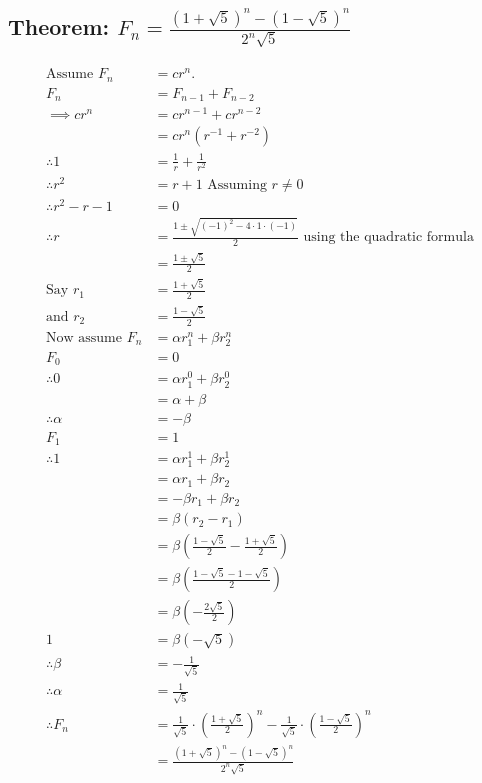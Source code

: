 \documentclass[11pt, oneside]{article}   	%
\begin{document}
	\subsection{Theorem: $F_n = \frac{(1 + \sqrt 5)^n - (1 - \sqrt 5)^n}{2^n\sqrt 5}$}
		\begin{align*}
			\text{Assume }F_n &= cr^n.\\
			F_n  &= F_{n-1} + F_{n - 2}\\
			\implies cr^n &= cr^{n-1} + cr^{n-2}\\
			  &= cr^n(r^{-1} + r^{-2})\\
			\therefore 1 &= \frac{1}{r} + \frac{1}{r^2}\\
			\therefore r^2& = r + 1\text{ Assuming } r\ne 0\\
			\therefore r^2 - r - 1& = 0\\
			\therefore r &= \frac{1 \pm \sqrt{(-1)^2 - 4\cdot 1 \cdot (-1)}}{2} \text{ using the quadratic formula}\\
			  &= \frac{1\pm \sqrt{5}}{2}\\
			\text{Say }r_1 &= \frac{1+\sqrt 5}{2}\\
			\text{and } r_2 &= \frac{1 - \sqrt 5}{2}\\
			\text{Now assume }F_n &= \alpha r_1^n + \beta r_2^n\\
			F_0 &= 0\\
			\therefore 0& = \alpha r_1^0 + \beta r_2^0\\
			& = \alpha + \beta\\
			\therefore \alpha &= -\beta\\
			F_1& = 1\\
			\therefore 1 &= \alpha r_1^1+\beta r_2^1\\
			  &= \alpha r_1+\beta r_2\\
			 & = -\beta r_1 + \beta r_2\\
			 & = \beta(r_2 - r_1)\\
			 & = \beta\left(\frac{1 - \sqrt 5}{2} - \frac{1 + \sqrt 5}{2}\right)\\
			  &= \beta\left(\frac{1 - \sqrt 5 -1 - \sqrt 5}{2}\right)\\
			 & = \beta\left(-\frac{2\sqrt 5}{2}\right)\\
			 1& = \beta\left(-\sqrt 5\right)\\
			\therefore \beta &= -\frac{1}{\sqrt 5}\\
			\therefore \alpha &= \frac{1}{\sqrt5}\\
			\therefore F_n &= \frac{1}{\sqrt 5}\cdot \left(\frac{1 + \sqrt 5}{2}\right)^n - \frac{1}{\sqrt 5} \cdot\left( \frac{1 - \sqrt 5}{2}\right)^n\\
			&= \frac{(1 + \sqrt 5)^n - (1 - \sqrt 5)^n}{2^n\sqrt 5}
		\end{align*}
\end{document}
